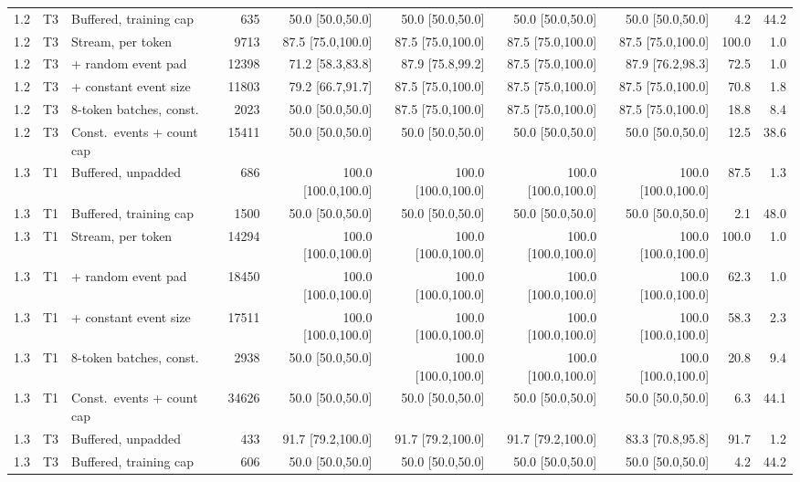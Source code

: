 \begin{table}[!ht]
\begin{tabular}{@{}lllrrrrrrr@{}}
1.2 & T3 & Buffered, training cap & 635 & 50.0 [50.0,50.0] & 50.0 [50.0,50.0] & 50.0 [50.0,50.0] & 50.0 [50.0,50.0] & 4.2 & 44.2\\
1.2 & T3 & Stream, per token & 9713 & 87.5 [75.0,100.0] & 87.5 [75.0,100.0] & 87.5 [75.0,100.0] & 87.5 [75.0,100.0] & 100.0 & 1.0\\
1.2 & T3 & + random event pad & 12398 & 71.2 [58.3,83.8] & 87.9 [75.8,99.2] & 87.5 [75.0,100.0] & 87.9 [76.2,98.3] & 72.5 & 1.0\\
1.2 & T3 & + constant event size & 11803 & 79.2 [66.7,91.7] & 87.5 [75.0,100.0] & 87.5 [75.0,100.0] & 87.5 [75.0,100.0] & 70.8 & 1.8\\
1.2 & T3 & 8-token batches, const. & 2023 & 50.0 [50.0,50.0] & 87.5 [75.0,100.0] & 87.5 [75.0,100.0] & 87.5 [75.0,100.0] & 18.8 & 8.4\\
1.2 & T3 & Const.\ events + count cap & 15411 & 50.0 [50.0,50.0] & 50.0 [50.0,50.0] & 50.0 [50.0,50.0] & 50.0 [50.0,50.0] & 12.5 & 38.6\\
1.3 & T1 & Buffered, unpadded & 686 & 100.0 [100.0,100.0] & 100.0 [100.0,100.0] & 100.0 [100.0,100.0] & 100.0 [100.0,100.0] & 87.5 & 1.3\\
1.3 & T1 & Buffered, training cap & 1500 & 50.0 [50.0,50.0] & 50.0 [50.0,50.0] & 50.0 [50.0,50.0] & 50.0 [50.0,50.0] & 2.1 & 48.0\\
1.3 & T1 & Stream, per token & 14294 & 100.0 [100.0,100.0] & 100.0 [100.0,100.0] & 100.0 [100.0,100.0] & 100.0 [100.0,100.0] & 100.0 & 1.0\\
1.3 & T1 & + random event pad & 18450 & 100.0 [100.0,100.0] & 100.0 [100.0,100.0] & 100.0 [100.0,100.0] & 100.0 [100.0,100.0] & 62.3 & 1.0\\
1.3 & T1 & + constant event size & 17511 & 100.0 [100.0,100.0] & 100.0 [100.0,100.0] & 100.0 [100.0,100.0] & 100.0 [100.0,100.0] & 58.3 & 2.3\\
1.3 & T1 & 8-token batches, const. & 2938 & 50.0 [50.0,50.0] & 100.0 [100.0,100.0] & 100.0 [100.0,100.0] & 100.0 [100.0,100.0] & 20.8 & 9.4\\
1.3 & T1 & Const.\ events + count cap & 34626 & 50.0 [50.0,50.0] & 50.0 [50.0,50.0] & 50.0 [50.0,50.0] & 50.0 [50.0,50.0] & 6.3 & 44.1\\
1.3 & T3 & Buffered, unpadded & 433 & 91.7 [79.2,100.0] & 91.7 [79.2,100.0] & 91.7 [79.2,100.0] & 83.3 [70.8,95.8] & 91.7 & 1.2\\
1.3 & T3 & Buffered, training cap & 606 & 50.0 [50.0,50.0] & 50.0 [50.0,50.0] & 50.0 [50.0,50.0] & 50.0 [50.0,50.0] & 4.2 & 44.2\\

\end{tabular}
\end{table}
